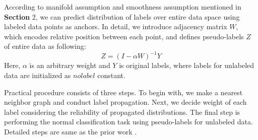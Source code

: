\documentclass[10pt,twocolumn,letterpaper]{article}
\begin{document}
According to manifold assumption and smoothness assumption mentioned in \textbf{Section} 2, we can predict distribution of labels over entire data space using labeled data points as anchors. In detail, we introduce adjacency matrix $W$, which encodes relative position between each point, and defines pseudo-labels $Z$ of entire data as following:
\begin{equation}
    Z=(I-\alpha W)^{-1}Y
\end{equation}
Here, $\alpha$ is an arbitrary weight and $Y$ is original labels, where labels for unlabeled data are initialized as $no label$ constant.

Practical procedure consists of three steps. To begin with, we make a nearest neighbor graph and conduct label propagation. Next, we decide weight of each label considering the reliability of propagated distributions. The final step is performing the normal classification task using pseudo-labels for unlabeled data. Detailed steps are same as the prior work \cite{Iscen2019}.\\ 



\end{document}
